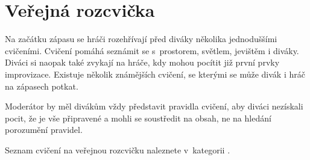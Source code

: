  
 
 
\needspace{5cm} \section{Veřejná rozcvička} \label{veřejná rozcvička} Na začátku zápasu se hráči rozehřívají před diváky několika jednoduššími cvičeními. Cvičení pomáhá seznámit se s~prostorem, světlem, jevištěm i diváky. 
Diváci si naopak také zvykají na hráče, kdy mohou pocítit již první prvky improvizace. 
Existuje několik známějších cvičení, se kterými se může divák i hráč na zápasech potkat. 
 
Moderátor by měl divákům vždy představit pravidla cvičení, aby diváci nezískali pocit, že je vše připravené a mohli se soustředit na obsah, ne na hledání porozumění pravidel. 
 
Seznam cvičení na veřejnou rozcvičku naleznete v~kategorii . 
 
 
